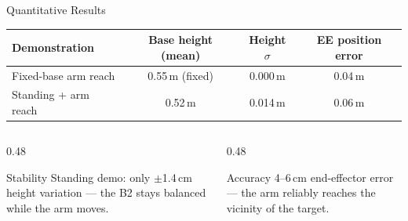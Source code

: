 \documentclass[10pt,aspectratio=169]{beamer}
\newenvironment{keybox}[1][Key Insight]{%
  \begin{exampleblock}{#1}}{\end{exampleblock}}
\begin{document}
\begin{frame}{Quantitative Results}
  \begin{table}
    \centering
    \begin{tabular}{l c c c}
      \toprule
      \textbf{Demonstration} & \textbf{Base height (mean)}
        & \textbf{Height $\sigma$} & \textbf{EE position error} \\
      \midrule
      Fixed-base arm reach       & 0.55\,m (fixed) & 0.000\,m & 0.04\,m \\
      Standing + arm reach       & 0.52\,m         & 0.014\,m & 0.06\,m \\
      \bottomrule
    \end{tabular}
  \end{table}

  \vspace{6pt}
  \begin{columns}[T]
    \begin{column}{0.48\textwidth}
      \begin{keybox}[Stability]
        Standing demo: only $\pm$1.4\,cm height variation ---
        the B2 stays balanced while the arm moves.
      \end{keybox}
    \end{column}
    \begin{column}{0.48\textwidth}
      \begin{keybox}[Accuracy]
        4--6\,cm end-effector error ---
        the arm reliably reaches the vicinity of the target.
      \end{keybox}
    \end{column}
  \end{columns}
\end{frame}
\end{document}
